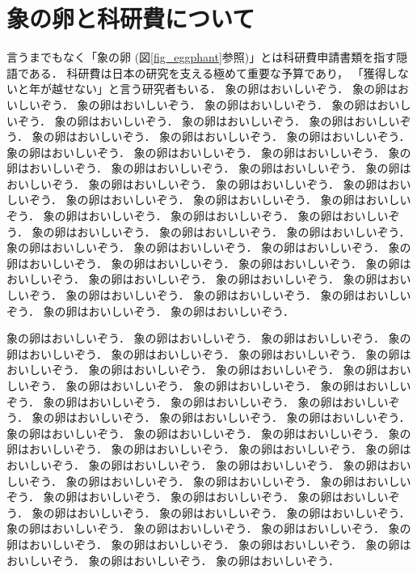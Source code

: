 \documentclass[b5paper,papersize,twocolumn]{jsarticle}
\begin{document}
\section{象の卵と科研費について}
言うまでもなく「象の卵 (図\ref{fig_eggphant}参照)」とは科研費申請書類を指す隠語である．
科研費は日本の研究を支える極めて重要な予算であり，
「獲得しないと年が越せない」と言う研究者もいる．
象の卵はおいしいぞう．
象の卵はおいしいぞう．
象の卵はおいしいぞう．
象の卵はおいしいぞう．
象の卵はおいしいぞう．
象の卵はおいしいぞう．
象の卵はおいしいぞう．
象の卵はおいしいぞう．
象の卵はおいしいぞう．
象の卵はおいしいぞう．
象の卵はおいしいぞう．
象の卵はおいしいぞう．
象の卵はおいしいぞう．
象の卵はおいしいぞう．
象の卵はおいしいぞう．
象の卵はおいしいぞう．
象の卵はおいしいぞう．
象の卵はおいしいぞう．
象の卵はおいしいぞう．
象の卵はおいしいぞう．
象の卵はおいしいぞう．
象の卵はおいしいぞう．
象の卵はおいしいぞう．
象の卵はおいしいぞう．
象の卵はおいしいぞう．
象の卵はおいしいぞう．
象の卵はおいしいぞう．
象の卵はおいしいぞう．
象の卵はおいしいぞう．
象の卵はおいしいぞう．
象の卵はおいしいぞう．
象の卵はおいしいぞう．
象の卵はおいしいぞう．
象の卵はおいしいぞう．
象の卵はおいしいぞう．
象の卵はおいしいぞう．
象の卵はおいしいぞう．
象の卵はおいしいぞう．
象の卵はおいしいぞう．
象の卵はおいしいぞう．
象の卵はおいしいぞう．
象の卵はおいしいぞう．
象の卵はおいしいぞう．
象の卵はおいしいぞう．
象の卵はおいしいぞう．



象の卵はおいしいぞう．
象の卵はおいしいぞう．
象の卵はおいしいぞう．
象の卵はおいしいぞう．
象の卵はおいしいぞう．
象の卵はおいしいぞう．
象の卵はおいしいぞう．
象の卵はおいしいぞう．
象の卵はおいしいぞう．
象の卵はおいしいぞう．
象の卵はおいしいぞう．
象の卵はおいしいぞう．
象の卵はおいしいぞう．
象の卵はおいしいぞう．
象の卵はおいしいぞう．
象の卵はおいしいぞう．
象の卵はおいしいぞう．
象の卵はおいしいぞう．
象の卵はおいしいぞう．
象の卵はおいしいぞう．
象の卵はおいしいぞう．
象の卵はおいしいぞう．
象の卵はおいしいぞう．
象の卵はおいしいぞう．
象の卵はおいしいぞう．
象の卵はおいしいぞう．
象の卵はおいしいぞう．
象の卵はおいしいぞう．
象の卵はおいしいぞう．
象の卵はおいしいぞう．
象の卵はおいしいぞう．
象の卵はおいしいぞう．
象の卵はおいしいぞう．
象の卵はおいしいぞう．
象の卵はおいしいぞう．
象の卵はおいしいぞう．
象の卵はおいしいぞう．
象の卵はおいしいぞう．
象の卵はおいしいぞう．
象の卵はおいしいぞう．
象の卵はおいしいぞう．
象の卵はおいしいぞう．
象の卵はおいしいぞう．
象の卵はおいしいぞう．
象の卵はおいしいぞう．
象の卵はおいしいぞう．
象の卵はおいしいぞう．
\end{document}
